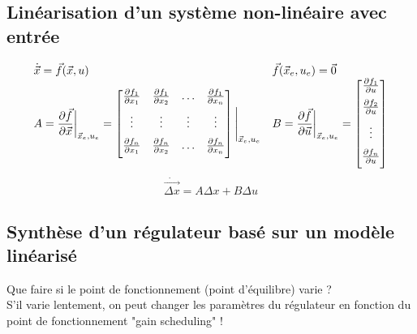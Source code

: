 \documentclass[document.tex]{subfiles}
\begin{document}
\subsection{Linéarisation d'un système non-linéaire avec entrée}

$$
\begin{array}{l l}

\dot{\vec{x}} = \vec{f}(\vec{x},u) & \vec{f}(\vec{x}_e,u_e)=\vec{0} \\

A = \dfrac{\partial \vec{f}}{\partial \vec{x}}\bigg\rvert_{\vec{x}_e,u_e} = \begin{bmatrix}
\frac{\partial f_1}{\partial x_1} & \frac{\partial f_1}{\partial x_2} & \ldots & \frac{\partial f_1}{\partial x_n} \\[6pt]
\vdots & \vdots & \vdots & \vdots \\[6pt]
\frac{\partial f_n}{\partial x_1} & \frac{\partial f_n}{\partial x_2} & \ldots & \frac{\partial f_n}{\partial x_n} \\[6pt]
\end{bmatrix} \Bigg\rvert_{\vec{x}_e,u_e} &
 B = \dfrac{\partial \vec{f}}{\partial \vec{u}}\bigg\rvert_{\vec{x}_e,u_e} = \begin{bmatrix}
\frac{\partial f_1}{\partial u} \\[6pt]
\frac{\partial f_2}{\partial u} \\[6pt]
\vdots \\[6pt]
\frac{\partial f_n}{\partial u} \\[6pt]
\end{bmatrix}
\end{array}
$$
$$\boxed{ \dot{\vec{\Delta x}} = A \Delta x + B \Delta u}$$

\subsection{Synthèse d'un régulateur basé sur un modèle linéarisé}

Que faire si le point de fonctionnement (point d'équilibre) varie ?\\

S'il varie lentement, on peut changer les paramètres du régulateur en fonction du point de fonctionnement "gain scheduling" !\\
\end{document}
